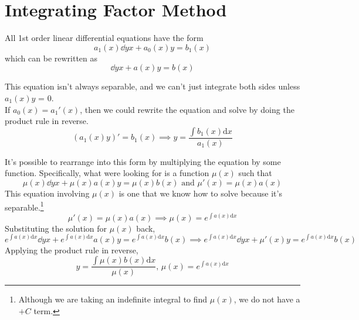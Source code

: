 \section{Integrating Factor Method}
All 1st order linear differential equations have the form
\begin{equation*}
	a_1(x)\dd{y}{x} + a_0(x)y = b_1(x)
\end{equation*}
which can be rewritten as
\begin{equation*}
	\dd{y}{x} + a(x)y = b(x)
\end{equation*}

\noindent
This equation isn't always separable, and we can't just integrate both sides unless $a_1(x)y$ = 0.\\

\noindent
If $a_0(x) = a_1'(x)$, then we could rewrite the equation and solve by doing the product rule in reverse.
\begin{equation*}
	\left(a_1(x)y\right)' = b_1(x) \implies y = \frac{\int{b_1(x) \mathrm{d}x}}{a_1(x)}
\end{equation*}

\noindent
It's possible to rearrange into this form by multiplying the equation by some function. Specifically, what were looking for is a function $\mu(x)$ such that
\begin{equation*}
	\mu(x)\dd{y}{x} + \mu(x)a(x)y = \mu(x)b(x) \text{ and } \mu'(x) = \mu(x)a(x)
\end{equation*}
This equation involving $\mu(x)$ is one that we know how to solve because it's separable.\footnote{Although we are taking an indefinite integral to find $\mu(x)$, we do not have a $+ C$ term.}
\begin{equation*}
	\mu'(x) = \mu(x)a(x) \implies \mu(x) = e^{\int{a(x) \mathrm{d}x}}
\end{equation*}
Substituting the solution for $\mu(x)$ back,
\begin{equation*}
	e^{\int{a(x) \mathrm{d}x}}\dd{y}{x} + e^{\int{a(x) \mathrm{d}x}}a(x)y = e^{\int{a(x) \mathrm{d}x}}b(x) \implies e^{\int{a(x) \mathrm{d}x}}\dd{y}{x} + \mu'(x)y = e^{\int{a(x) \mathrm{d}x}}b(x)
\end{equation*}
Applying the product rule in reverse,
\begin{equation*}
	y = \frac{\int{\mu(x)} b(x) \mathrm{d}x}{\mu(x)} \text{, } \mu(x) = e^{\int{a(x) \mathrm{d}x}}
\end{equation*}


\ifodd{}\fi